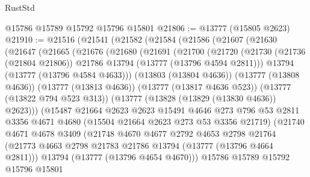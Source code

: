 \begin{lexlean}{RustStd}
\begin{coremodule}
    @15786
    @15789
    @15792
    @15796
    @15801
@21806 := @13777 (@15805 @2623)
@21910 := @21516
    (@21541
      (@21582
        (@21584
          (@21586
            (@21607
              (@21630
                (@21647
                  (@21665
                    (@21676
                      (@21680
                        (@21691
                          (@21700
                            (@21720
                              (@21730
                                (@21736 (@21804 @21806))
                                @21786
                                @13794
                                (@13777 (@13796 @4594 @2811)))
                              @13794
                              (@13777 (@13796 @4584 @4633)))
                            (@13803 (@13804 @4636))
                            (@13777 (@13808 @4636))
                            (@13777 (@13813 @4636))
                            (@13777 (@13817 @4636 @523))
                            (@13777 (@13822 @794 @523 @313))
                            (@13777 (@13828 (@13829 (@13830 @4636)) @2623)))
                          (@15487
                            @21664
                            @2623
                            @2623
                            @15491
                            @4646
                            @273
                            @796
                            @53
                            @2811
                            @3356
                            @4671
                            @4680
                            (@15504 @21664 @2623 @273 @53 @3356 @21719)
                            (@21740
                              @4671
                              @4678
                              @3409
                              (@21748
                                @4670
                                @4677
                                @2792
                                @4653
                                @2798
                                @21764
                                (@21773
                                  @4663
                                  @2798
                                  @21783
                                  @21786
                                  @13794
                                  (@13777 (@13796 @4664 @2811)))
                                @13794
                                (@13777 (@13796 @4654 @4670)))
                              @15786
                              @15789
                              @15792
                              @15796
                              @15801

\end{coremodule}
\end{lexlean}
